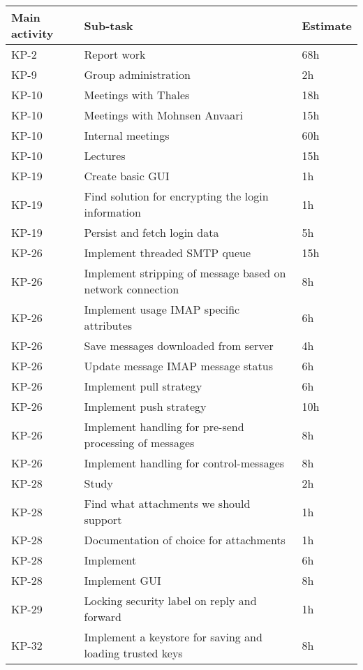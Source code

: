 \begin{table}
\begin{tabularx}{\linewidth}{>{\setlength\hsize{.2\hsize}}X|>{\setlength\hsize{1.5\hsize}}X|>{\setlength\hsize{.1\hsize}}X}
\textbf{Main activity} &  \textbf{Sub-task} & \textbf{Estimate}\\ \hline \hline
KP-2 & Report work & 68h\\ \hline
KP-9 & Group administration & 2h\\ \hline
KP-10 & Meetings with Thales & 18h\\ \hline
KP-10 & Meetings with Mohnsen Anvaari & 15h\\ \hline
KP-10 & Internal meetings & 60h\\ \hline
KP-10 & Lectures & 15h\\ \hline
KP-19	& Create basic GUI & 1h\\ \hline
KP-19	& Find solution for encrypting the login information & 1h\\ \hline
KP-19	& Persist and fetch login data & 5h\\ \hline
KP-26 & Implement threaded SMTP queue & 15h\\ \hline
KP-26 & Implement stripping of message based on network connection & 8h\\ \hline
KP-26	& Implement usage IMAP specific attributes & 6h\\ \hline
KP-26 & Save messages downloaded from server & 4h\\ \hline
KP-26 & Update message IMAP message status & 6h\\ \hline
KP-26 & Implement pull strategy & 6h\\ \hline
KP-26 & Implement push strategy & 10h\\ \hline
KP-26 & Implement handling for pre-send processing of messages & 8h\\ \hline
KP-26 & Implement handling for control-messages & 8h\\ \hline
KP-28	& Study & 2h\\ \hline
KP-28	& Find what attachments we should support & 1h\\ \hline
KP-28	& Documentation of choice for attachments & 1h\\ \hline
KP-28 & Implement & 6h\\ \hline
KP-28 & Implement GUI & 8h\\ \hline
KP-29	& Locking security label on reply and forward & 1h\\ \hline
KP-32	& Implement a keystore for saving and loading trusted keys & 8h\\ \hline

\end{tabularx}
\end{table}
